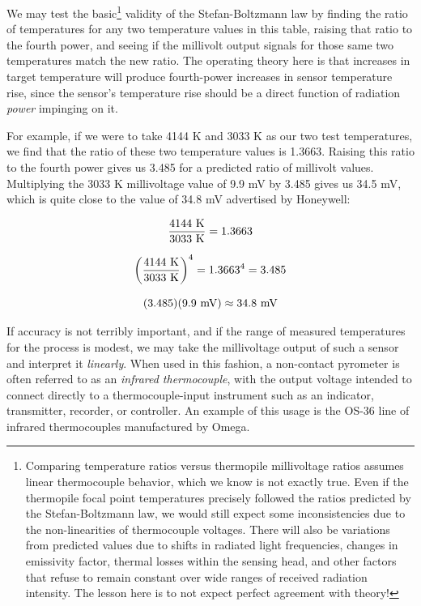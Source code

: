 We may test the basic\footnote{Comparing temperature ratios versus thermopile millivoltage ratios assumes linear thermocouple behavior, which we know is not exactly true.  Even if the thermopile focal point temperatures precisely followed the ratios predicted by the Stefan-Boltzmann law, we would still expect some inconsistencies due to the non-linearities of thermocouple voltages.  There will also be variations from predicted values due to shifts in radiated light frequencies, changes in emissivity factor, thermal losses within the sensing head, and other factors that refuse to remain constant over wide ranges of received radiation intensity.  The lesson here is to not expect perfect agreement with theory!} validity of the Stefan-Boltzmann law by finding the ratio of temperatures for any two temperature values in this table, raising that ratio to the fourth power, and seeing if the millivolt output signals for those same two temperatures match the new ratio.  The operating theory here is that increases in target temperature will produce fourth-power increases in sensor temperature rise, since the sensor's temperature rise should be a direct function of radiation \textit{power} impinging on it.  

For example, if we were to take 4144 K and 3033 K as our two test temperatures, we find that the ratio of these two temperature values is 1.3663.  Raising this ratio to the fourth power gives us 3.485 for a predicted ratio of millivolt values.  Multiplying the 3033 K millivoltage value of 9.9 mV by 3.485 gives us 34.5 mV, which is quite close to the value of 34.8 mV advertised by Honeywell:

$${4144 \hbox{ K} \over 3033 \hbox{ K}} = 1.3663$$

$$\left({4144 \hbox{ K} \over 3033 \hbox{ K}}\right)^4 = 1.3663^4 = 3.485$$

$$(3.485)(9.9 \hbox{ mV}) \approx 34.8 \hbox{ mV}$$

If accuracy is not terribly important, and if the range of measured temperatures for the process is modest, we may take the millivoltage output of such a sensor and interpret it \textit{linearly}.  When used in this fashion, a non-contact pyrometer is often referred to as an \textit{infrared thermocouple}, with the output voltage intended to connect directly to a thermocouple-input instrument such as an indicator, transmitter, recorder, or controller.  An example of this usage is the OS-36 line of infrared thermocouples manufactured by Omega.    

